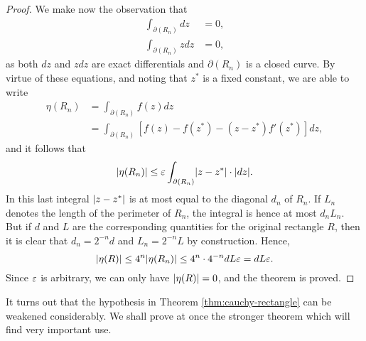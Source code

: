 \begin{proof}
We make now the observation that
\begin{align*}
\int_{\partial(R_n)}dz &=0, \\
\int_{\partial(R_n)}zdz &=0,
\end{align*}
as both $dz$ and $zdz$ are exact differentials and $\partial(R_n)$ is a closed curve. By virtue of these equations, and noting that $z^*$ is a fixed constant, we are able to write
\begin{align*}
\eta(R_n) &= \int_{\partial(R_n)} f(z)dz \\
&=\int_{\partial(R_n)}\left[f(z)-f(z^*)-(z-z^*)f'(z^*)\right]dz,
\end{align*}
and it follows that $$\lvert \eta(R_n) \rvert \le \varepsilon \int_{\partial(R_n)}\lvert z-z^* \rvert \cdot \lvert dz \rvert.$$ In this last integral $\lvert z-z^* \rvert$ is at most equal to the diagonal $d_n$ of $R_n$. If $L_n$ denotes the length of the perimeter of $R_n$, the integral is hence at most $d_nL_n$. But if $d$ and $L$ are the corresponding quantities for the original rectangle $R$, then it is clear that $d_n=2^{-n}d$ and $L_n=2^{-n}L$ by construction. Hence, $$\lvert \eta(R) \rvert \le 4^{n}\lvert \eta(R_n) \rvert \le 4^{n} \cdot 4^{-n}dL\varepsilon=dL\varepsilon.$$ Since $\varepsilon$ is arbitrary, we can only have $\lvert \eta(R) \rvert=0$, and the theorem is proved.
\end{proof}

It turns out that the hypothesis in Theorem \ref{thm:cauchy-rectangle} can be weakened considerably. We shall prove at once the stronger theorem which will find very important use.

